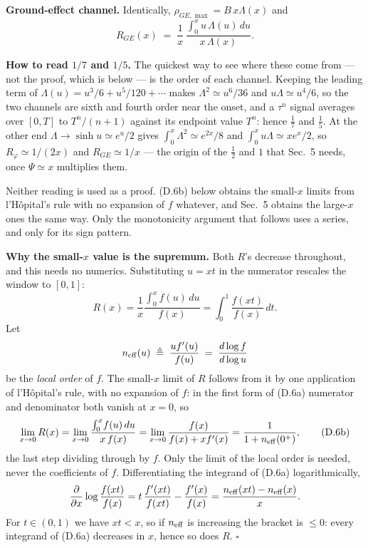 \documentclass[11pt]{article}
\begin{document}
\textbf{Ground-effect channel.} Identically,
$\rho_{GE,\max} = B\,x\Lambda(x)$ and
\begin{equation}
  R_{GE}(x) \;=\; \frac{1}{x}\,
  \frac{\int_0^x u\,\Lambda(u)\,du}{x\,\Lambda(x)} .
  \tag{D.7}
\end{equation}

\textbf{How to read $1/7$ and $1/5$.} The quickest way to see where
these come from --- not the proof, which is below --- is the order of
each channel. Keeping the leading term of
$\Lambda(u) = u^3/6 + u^5/120 + \cdots$ makes $\Lambda^2\simeq u^6/36$
and $u\Lambda\simeq u^4/6$, so the two channels are sixth and fourth
order near the onset, and a $\tau^n$ signal averages over $[0,T]$ to
$T^n/(n{+}1)$ against its endpoint value $T^n$: hence $\tfrac17$ and
$\tfrac15$. At the other end $\Lambda\to\sinh u\simeq e^u/2$ gives
$\int_0^x\Lambda^2\simeq e^{2x}/8$ and $\int_0^xu\Lambda\simeq xe^x/2$,
so $R_\varphi\simeq1/(2x)$ and $R_{GE}\simeq1/x$ --- the origin of the
$\tfrac12$ and $1$ that Sec.~5 needs, once $\Psi\simeq x$ multiplies
them.

Neither reading is used as a proof. (D.6b) below obtains the small-$x$
limits from l'H\^opital's rule with no expansion of $f$ whatever, and
Sec.~5 obtains the large-$x$ ones the same way. Only the monotonicity
argument that follows uses a series, and only for its sign pattern.

\textbf{Why the small-$x$ value is the supremum.} Both $R$'s decrease
throughout, and this needs no numerics. Substituting $u = xt$ in the
numerator rescales the window to $[0,1]$:
\begin{equation}
  R(x) = \frac{1}{x}\frac{\int_0^x f(u)\,du}{f(x)}
       = \int_0^1 \frac{f(xt)}{f(x)}\,dt .
  \tag{D.6a}
\end{equation}
Let
\[
  n_{\rm eff}(u) \;\triangleq\; \frac{u f'(u)}{f(u)}
  \;=\; \frac{d\log f}{d\log u}
\]
be the \emph{local order} of $f$. The small-$x$ limit of $R$ follows
from it by one application of l'H\^opital's rule, with no expansion of
$f$: in the first form of (D.6a) numerator and denominator both vanish
at $x=0$, so
\begin{equation}
  \lim_{x\to0}R(x)
  = \lim_{x\to0}\frac{\int_0^x\!f(u)\,du}{x\,f(x)}
  = \lim_{x\to0}\frac{f(x)}{f(x) + x f'(x)}
  = \frac{1}{1 + n_{\rm eff}(0^+)} ,
  \tag{D.6b}
\end{equation}
the last step dividing through by $f$. Only the limit of the local
order is needed, never the coefficients of $f$. Differentiating the
integrand of
(D.6a) logarithmically,
\[
  \frac{\partial}{\partial x}\log\frac{f(xt)}{f(x)}
  = t\,\frac{f'(xt)}{f(xt)} - \frac{f'(x)}{f(x)}
  = \frac{n_{\rm eff}(xt) - n_{\rm eff}(x)}{x} .
\]
For $t\in(0,1)$ we have $xt < x$, so if $n_{\rm eff}$ is increasing the
bracket is $\le0$: every integrand of (D.6a) decreases in $x$, hence so
does $R$. $\square$
\end{document}
